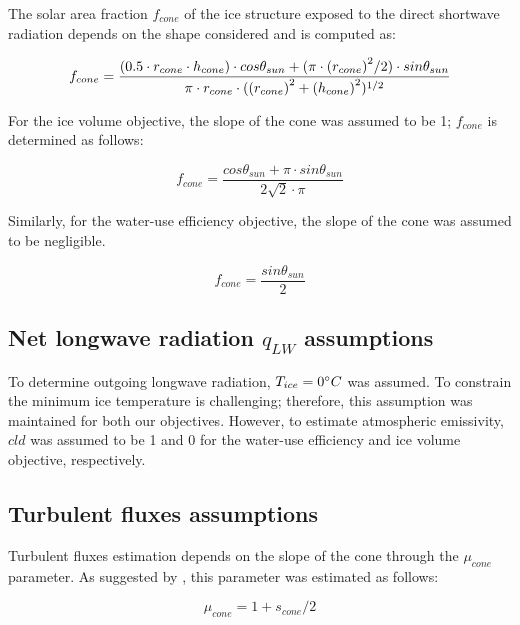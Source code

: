 \documentclass[tc, manuscript]{copernicus}
\begin{document}
The solar area fraction $f_{cone}$ of the ice structure exposed to the direct shortwave radiation depends on the
shape considered and is computed as:

\begin{equation}
		f_{cone} =\frac{(0.5 \cdot r_{cone} \cdot h_{cone}) \cdot cos \theta_{sun} +(\pi \cdot
			{(r_{cone})}^2/2) \cdot sin \theta_{sun} }{\pi \cdot r_{cone} \cdot ({(r_{cone})}^2+{(h_{cone})}^2)^{1/2}}\\
\end{equation}

For the ice volume objective, the slope of the cone was assumed to be 1; $f_{cone}$ is determined as follows:

\begin{equation}
		f_{cone} =\frac{ cos \theta_{sun} + \pi \cdot sin \theta_{sun} }{2\sqrt{2} \cdot \pi }
\end{equation}

Similarly, for the water-use efficiency objective, the slope of the cone was assumed to be negligible.

\begin{equation}
		f_{cone} =\frac{ sin \theta_{sun} }{2 }
\end{equation}

\subsection{Net longwave radiation \texorpdfstring{$q_{LW}$}{Lg} assumptions} 

To determine outgoing longwave radiation, $T_{ice} = 0 ^{\circ} C$ was assumed. To constrain the minimum ice
temperature is challenging; therefore, this assumption was maintained for both our objectives. However, to
estimate atmospheric emissivity, $cld$ was assumed to be 1 and 0 for the water-use efficiency and ice volume
objective, respectively.

\subsection{Turbulent fluxes assumptions} \label{sec:Qs}

Turbulent fluxes estimation depends on the slope of the cone through the $\mu_{cone}$ parameter. As suggested 
by \citet{oerlemansBriefCommunicationGrowth2021}, this parameter was estimated as follows:

\begin{equation}
  \mu_{cone} =1 + s_{cone}/2
\end{equation}
\end{document}
